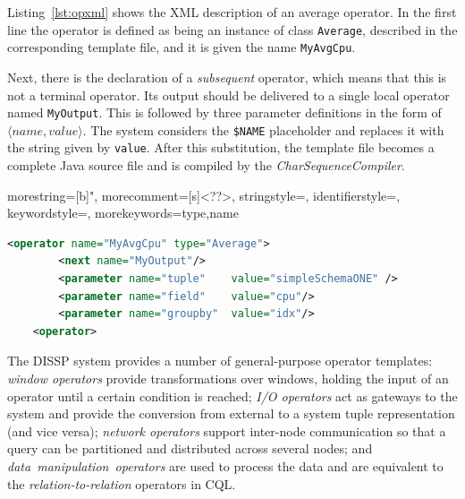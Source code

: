 Listing~\ref{lst:opxml} shows the XML description of an average operator. In the first line the
operator is defined as being an instance of class \texttt{Average}, described in the corresponding
template file, and it is given the name \texttt{MyAvgCpu}. 

Next, there is the declaration of a \textit{subsequent} operator, which means that this is not a terminal
operator. Its output should be delivered to a single local operator named \texttt{MyOutput}. 
This is followed by three parameter definitions in the form of $\langle name,
value \rangle$. The system considers the \texttt{\$NAME} placeholder and replaces it with the string
given by \texttt{value}. After this substitution, the template file becomes a
complete Java source file and is compiled by the \textit{CharSequenceCompiler}.

{
  morestring=[b]",
  morecomment=[s]{<?}{?>},
  stringstyle=\color{BrickRed},
  identifierstyle=\color{NavyBlue},
  keywordstyle=\color{ForestGreen}, 
  morekeywords={type,name}%
}
\noindent\begin{minipage}{\textwidth}
\begin{lstlisting}[language=XML,label=lst:opxml,caption=XML description of an Average operator]
	<operator name="MyAvgCpu" type="Average">
	    <next name="MyOutput"/>
	    <parameter name="tuple"    value="simpleSchemaONE" />
	    <parameter name="field"    value="cpu"/>
	    <parameter name="groupby"  value="idx"/>
	<operator>
\end{lstlisting}
\end{minipage}	
The DISSP system provides a number of general-purpose operator templates: \textit{window operators}
provide transformations over windows, holding the input of an operator until a certain condition is
reached; \textit{I/O operators} act as gateways to the system and provide the conversion from
external to a system tuple representation (and vice versa); \textit{network operators} support
inter-node communication so that a query can be partitioned and distributed across several nodes;
and \textit{\mbox{data manipulation operators}} are used to process the data and are equivalent to the
\textit{relation-to-relation} operators in CQL.

